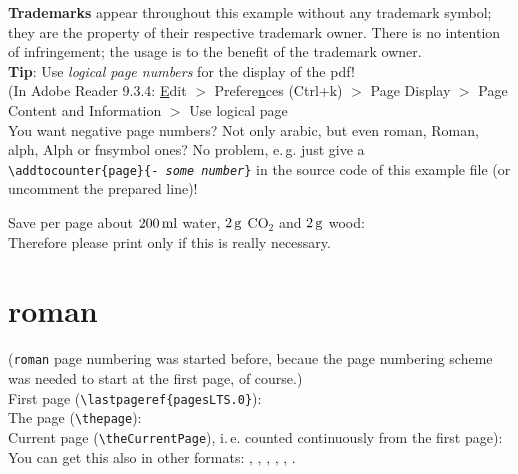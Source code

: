 \documentclass[british]{article}
\gdef\unit#1{\mathord{\thinspace\mathrm{#1}}}%
\begin{document}
\textbf{Trademarks} appear throughout this example without any
trademark symbol; they are the property of their respective
trademark owner. There is no intention of infringement; the
usage is to the benefit of the trademark owner.\\

\textbf{Tip}: Use \textit{logical page numbers} for
the display of the pdf!\\
(In Adobe Reader 9.3.4: \underline{E}dit $>$
Prefere\underline{n}ces (Ctrl+k) $>$ Page Display $>$
Page Content and Information $>$ Use logical page
\\

You want negative page numbers? Not only arabic, but even roman,
Roman, alph, Alph or fnsymbol ones? No problem, e.\,g. just give a\\
\texttt{\textbackslash addtocounter\{page\}\{- \textit{some number}\}}
in the source code of this example file (or uncomment the prepared
line)!

\bigskip

Save per page about $200\unit{ml}$ water, $2\unit{g}$ CO$_{2}$
and $2\unit{g}$ wood:\\
Therefore please print only if this is really necessary.

\pagebreak

\tableofcontents

\newpage


\section{roman}

\noindent (\texttt{roman} page numbering was started before,
becaue the page numbering scheme was needed to start at
the first page, of course.)\\

\noindent First page (\texttt{\textbackslash lastpageref\{pagesLTS.0\}}):
\\

\noindent The page (\texttt{\textbackslash thepage}): \thepage \\

\noindent Current page (\texttt{\textbackslash theCurrentPage}),
i.\,e. counted continuously from the first page): \theCurrentPage \\
You can get this also in other formats:
, , ,
, , .
\end{document}
